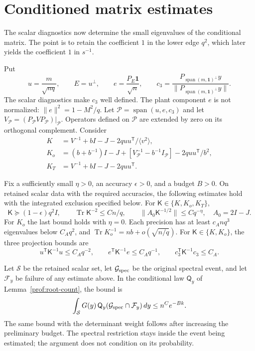 \section{Conditioned matrix estimates}\label{prof:matrices}

The scalar diagnostics now determine the small eigenvalues of the
conditional matrix. The point is to retain the coefficient $1$ in the
lower edge $q^2$, which later yields the coefficient $1$ in $s^{-1}$.

Put
\[
 u=\frac{m}{\sqrt{nq}},\qquad E=u^\perp,\qquad
 e=\frac{P_E\mathbf1}{\sqrt n},\qquad
 c_3=\frac{P_{\operatorname{span}(m,\mathbf1)^\perp}y}
            {\|P_{\operatorname{span}(m,\mathbf1)^\perp}y\|}.
\]
The scalar diagnostics make $c_3$ well defined. The plant component
$e$ is not normalized: $\|e\|^2=1-M^2/q$. Let
$\mathcal P=\operatorname{span}(u,e,c_3)$ and let
$V_{\mathcal P}=(P_{\mathcal P}VP_{\mathcal P})|_{\mathcal P}$.
Operators defined on $\mathcal P$ are extended by zero on its
orthogonal complement. Consider
\[
 \begin{split}
 K&=V^{-1}+bI-J-2q uu^{\mathsf T}/\langle v^2\rangle,\\
 K_o&=(b+b^{-1})I-J+
       [V_{\mathcal P}^{-1}-b^{-1}I_{\mathcal P}]
       -2q uu^{\mathsf T}/b^2,\\
 K_T&=V^{-1}+bI-J-2q uu^{\mathsf T}.
 \end{split}
\]

\begin{proposition}\label{prof:conditioned-precision}
Fix a sufficiently small $\eta>0$, an accuracy $\epsilon>0$, and a
budget $B>0$. On retained scalar data with the required accuracies,
the following estimates hold with the integrated exclusion specified
below. For $\mathsf K\in\{K,K_o,K_T\}$,
\begin{equation}\label{prof:eq10}
 \mathsf K\succeq(1-\epsilon)q^2I,\qquad
 \operatorname{Tr}\mathsf K^{-2}\le Cn/q,\qquad
 \|A_0\mathsf K^{-1/2}\|\le Cq^{-\eta},
 \quad A_0=2I-J.
\end{equation}
For $K_o$ the last bound holds with $\eta=0$. Each precision has at
least $c_A nq^3$ eigenvalues below $C_Aq^2$, and
$\operatorname{Tr}K_o^{-1}=nb+o(\sqrt{n/q})$. For
$\mathsf K\in\{K,K_o\}$, the three projection bounds are
\[
 u^{\mathsf T}\mathsf K^{-1}u\le C_Aq^{-2},\qquad
 e^{\mathsf T}\mathsf K^{-1}e\le C_Aq^{-1},\qquad
 c_3^{\mathsf T}\mathsf K^{-1}c_3\le C_A.
\]

Let $\mathcal S$ be the retained scalar set, let $\mathcal G_{\rm spec}$
be the original spectral event, and let $\mathcal F_y$ be failure of
any estimate above. In the conditional law $\mathsf Q_y$ of
Lemma~\ref{prof:root-count}, the bound is
\[
 \int_{\mathcal S}G(y)\,
       \mathsf Q_y(\mathcal G_{\rm spec}\cap\mathcal F_y)\,dy
 \le n^C e^{-Bk}.
\]
The same bound with the determinant weight follows after increasing
the preliminary budget. The spectral restriction stays inside the
event being estimated; the argument does not condition on its probability.
\end{proposition}


